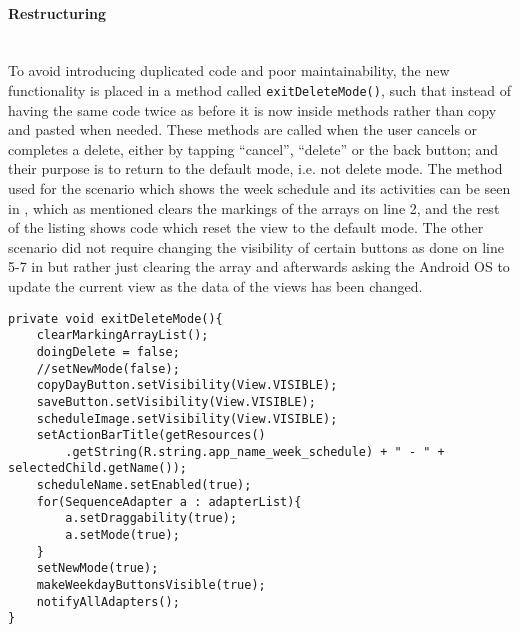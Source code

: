 \paragraph{Restructuring} \hfill\\
To avoid introducing duplicated code and poor maintainability, the new functionality is placed in a method called \texttt{exitDeleteMode()}, such that instead of having the same code twice as before it is now inside methods rather than copy and pasted when needed.
These methods are called when the user cancels or completes a delete, either by tapping \enquote{cancel}, \enquote{delete} or the back button;
and their purpose is to return to the default mode, i.e. not delete mode.
The method used for the scenario which shows the week schedule and its activities can be seen in , which as mentioned clears the markings of the arrays on line 2, and the rest of the listing shows code which reset the view to the default mode.
The other scenario did not require changing the visibility of certain buttons as done on line 5-7 in  but rather just clearing the array and afterwards asking the Android OS to update the current view as the data of the views has been changed.

\begin{lstlisting}[caption={The \texttt{exitDeleteMode()} method, which returns the application to the default mode}, label={lst:exitdeletemode}]
private void exitDeleteMode(){
    clearMarkingArrayList();
    doingDelete = false;
    //setNewMode(false);
    copyDayButton.setVisibility(View.VISIBLE);
    saveButton.setVisibility(View.VISIBLE);
    scheduleImage.setVisibility(View.VISIBLE);
    setActionBarTitle(getResources()
        .getString(R.string.app_name_week_schedule) + " - " + selectedChild.getName());
    scheduleName.setEnabled(true);
    for(SequenceAdapter a : adapterList){
        a.setDraggability(true);
        a.setMode(true);
    }
    setNewMode(true);
    makeWeekdayButtonsVisible(true);
    notifyAllAdapters();
}
\end{lstlisting}
